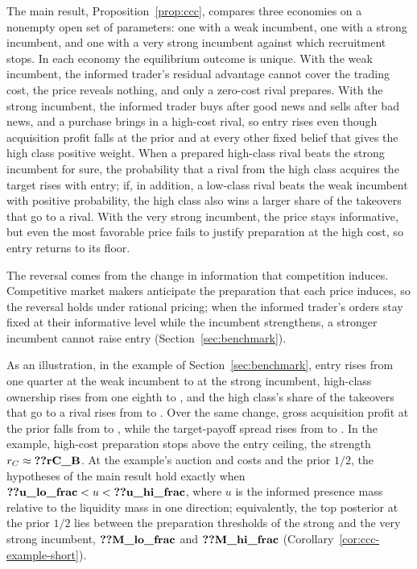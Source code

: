 The main result, Proposition~\ref{prop:ccc}, compares three economies on a nonempty open set of parameters: one with a weak incumbent, one
with a strong incumbent, and one with a very strong incumbent against which recruitment stops. In each economy the
equilibrium outcome is unique. With the weak incumbent, the informed trader's residual advantage cannot
cover the trading cost, the price reveals nothing, and only a zero-cost rival prepares. With the strong
incumbent, the informed trader buys after good news and sells after bad news, and a purchase brings in a high-cost
rival, so entry rises even though acquisition profit falls at the prior and at every other fixed belief that
gives the high class positive weight. When a prepared high-class
rival beats the strong incumbent for sure, the probability that a rival from the high class acquires the
target rises with entry; if, in addition, a low-class rival beats the weak incumbent with positive probability,
the high class also wins a larger share of the takeovers that go to a rival. With the very strong incumbent, the
price stays informative, but even the most favorable price fails to justify preparation at the high cost, so entry
returns to its floor.

The reversal comes from the change in information that competition induces. Competitive market makers anticipate the
preparation that each price induces, so the reversal holds under rational pricing; when the informed trader's orders
stay fixed at their informative level while the incumbent strengthens, a stronger incumbent cannot raise entry
(Section~\ref{sec:benchmark}).

As an illustration, in the example of Section~\ref{sec:benchmark}, entry rises from one quarter at the weak
incumbent to  at the strong incumbent, high-class ownership rises from one eighth to
, and the high class's share of the takeovers that go to a rival rises from
 to . Over the same change, gross acquisition profit at the prior falls
from  to , while the target-payoff spread rises from  to
. In the example, high-cost preparation stops above the entry ceiling, the strength
\(r_C\approx\reg{rC_B}\). At the example's auction and costs and the prior \(1/2\), the hypotheses of the main
result hold exactly when \(\reg{u_lo_frac}<u<\reg{u_hi_frac}\), where \(u\) is the informed presence mass relative
to the liquidity mass in one direction; equivalently, the top posterior at the prior \(1/2\) lies between the
preparation thresholds of the strong and the very strong incumbent, \(\reg{M_lo_frac}\) and \(\reg{M_hi_frac}\)
(Corollary~\ref{cor:ccc-example-short}).

